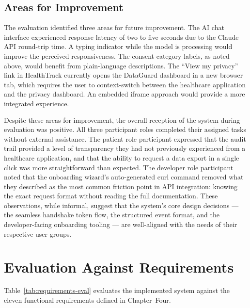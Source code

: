 \documentclass[a4paper,12pt,onecolumn]{report}
\begin{document}
\subsection{Areas for Improvement}

The evaluation identified three areas for future improvement.
The AI chat interface experienced response latency of two to five seconds due to the Claude API round-trip time.
A typing indicator while the model is processing would improve the perceived responsiveness.
The consent category labels, as noted above, would benefit from plain-language descriptions.
The ``View my privacy'' link in HealthTrack currently opens the DataGuard dashboard in a new browser tab, which requires the user to context-switch between the healthcare application and the privacy dashboard.
An embedded iframe approach would provide a more integrated experience.

Despite these areas for improvement, the overall reception of the system during evaluation was positive.
All three participant roles completed their assigned tasks without external assistance.
The patient role participant expressed that the audit trail provided a level of transparency they had not previously experienced from a healthcare application, and that the ability to request a data export in a single click was more straightforward than expected.
The developer role participant noted that the onboarding wizard's auto-generated curl command removed what they described as the most common friction point in API integration: knowing the exact request format without reading the full documentation.
These observations, while informal, suggest that the system's core design decisions --- the seamless handshake token flow, the structured event format, and the developer-facing onboarding tooling --- are well-aligned with the needs of their respective user groups.

\section{Evaluation Against Requirements}

Table~\ref{tab:requirements-eval} evaluates the implemented system against the eleven functional requirements defined in Chapter~Four.
\end{document}
